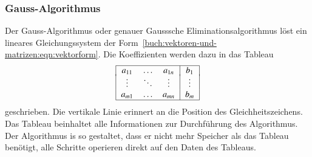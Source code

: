 \subsubsection{Gauss-Algorithmus}
Der Gauss-Algorithmus oder genauer Gausssche Eliminationsalgorithmus
löst ein lineares Gleichungssystem der
%
%
Form~\eqref{buch:vektoren-und-matrizen:eqn:vektorform}.
Die Koeffizienten werden dazu in das Tableau
\[
\begin{tabular}{|>{$}c<{$}>{$}c<{$}>{$}c<{$}|>{$}c<{$}|}
\hline
a_{11}&\dots &a_{1n}&b_1   \\[-2pt]
\vdots&\ddots&\vdots&\vdots\\
a_{m1}&\dots &a_{mn}&b_m   \\
\hline
\end{tabular}
\]
geschrieben.
Die vertikale Linie erinnert an die Position des Gleichheitszeichens.
Das Tableau beinhaltet alle Informationen zur Durchführung des Algorithmus.
Der Algorithmus is so gestaltet, dass er nicht mehr Speicher als
das Tableau benötigt, alle Schritte operieren direkt auf den Daten
des Tableaus.

